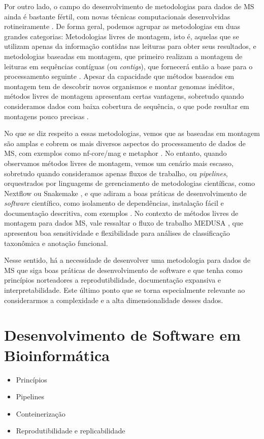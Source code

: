 \documentclass[
	12pt,				%
	oneside,			%
	a4paper,			%
	chapter=TITLE,		%
	section=TITLE,		%
	english,			%
	brazil				%
	]{abntex2}
\begin{document}
Por outro lado, o campo do desenvolvimento de metodologias para dados de \gls{MS} ainda é bastante fértil, com novas técnicas computacionais desenvolvidas rotineiramente \autocite{liu2021}. De forma geral, podemos agrupar as metodologias em duas grandes categorias: Metodologias livres de montagem, isto é, aquelas que se utilizam apenas da informação contidas nas leituras para obter seus resultados, e metodologias baseadas em montagem, que primeiro realizam a montagem de leituras em sequências contíguas (ou \textit{contigs}), que fornecerá então a base para o processamento seguinte \autocite{breitwieser2019}. Apesar da capacidade que métodos baseados em montagem tem de descobrir novos organismos e montar genomas inéditos, métodos livres de montagem apresentam certas vantagens, sobretudo quando consideramos dados com baixa cobertura de sequência, o que pode resultar em montagens pouco precisas \autocite{ayling2020}.

No que se diz respeito a essas metodologias, vemos que as baseadas em montagem são amplas e cobrem os mais diversos aspectos do processamento de dados de \gls{MS}, com exemplos como nf-core/mag \autocite{krakau2022} e metaphor \autocite{salazar2023}. No entanto, quando observamos métodos livres de montagem, vemos um cenário mais escasso, sobretudo quando consideramos apenas fluxos de trabalho, ou \emph{pipelines}, orquestrados por linguagems de gerenciamento de metodologias científicas, como Nextflow \autocite{ditommaso2017} ou Snakemake \autocite{mölder2021}, e que adiram a boas práticas de desenvolvimento de \emph{software} científico, como isolamento de dependências, instalação fácil e documentação descritiva, com exemplos \autocite{mangul2019}. No contexto de métodos livres de montagem para dados \gls{MS}, vale ressaltar o fluxo de trabalho MEDUSA \autocite{morais2022}, que apresentou boa sensitividade e flexibilidade para análises de classificação taxonômica e anotação funcional.

Nesse sentido, há a necessidade de desenvolver uma metodologia para dados de \gls{MS} que siga boas práticas de desenvolvimento de software e que tenha como princípios norteadores a reprodutibilidade, documentação expansiva e interpretabilidade. Este último ponto que se torna especialmente relevante ao considerarmos a complexidade e a alta dimensionalidade desses dados.

\section{Desenvolvimento de Software em Bioinformática}\label{desenvolvimento-de-software-em-bioinformuxe1tica}
\begin{itemize}
\tightlist
\item
  Princípios
\item
  Pipelines
\item
  Conteinerização
\item
  Reprodutibilidade e replicabilidade
\end{itemize}
\end{document}
